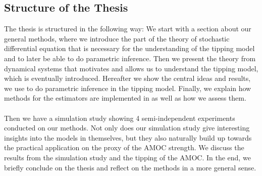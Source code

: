 \subsection{Structure of the Thesis}
The thesis is structured in the following way: We start with a section about our general methods, where we  introduce the part of the theory of stochastic differential equation that is necessary for the understanding of the tipping model and to later be able to do parametric inference. Then we present the theory from dynamical systems that motivates and allows us to understand the tipping model, which is eventually introduced. Hereafter we show the central ideas and results, we use to do parametric inference in the tipping model. Finally, we explain how methods for the estimators are implemented in  as well as how we assess them. \\\\
Then we have a simulation study showing 4 semi-independent experiments conducted on our methods. Not only does our simulation study give interesting insights into the models in themselves, but they also naturally build up towards the practical application on the proxy of the AMOC strength. We discuss the results from the simulation study and the tipping of the AMOC. In the end, we briefly conclude on the thesis and reflect on the methods in a more general sense.